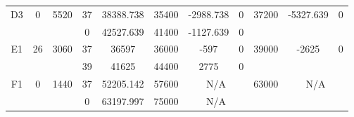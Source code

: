 \begin{sidewaystable}
\begin{tabular}{c||c|c||c|c|c|c|c||c|c|c}
         &
        
      \\
      \hline
      \multirow{2}{*}{D3} &
      \multirow{2}{*}{0} &
      \multirow{2}{*}{5520} &
      37 &
      38388.738 &
      35400 &
        -2988.738 &
        0 &
      \multirow{2}{*}{37200} &
        \multirow{2}{*}{-5327.639} &
        \multirow{2}{*}{0}
      \\
      \cline{4-8}
       &
       &
       &
      0 &
      42527.639 &
      41400 &
        -1127.639 &
        0 &
      
         &
        
      \\
      \hline
      \multirow{2}{*}{E1} &
      \multirow{2}{*}{26} &
      \multirow{2}{*}{3060} &
      37 &
      36597 &
      36000 &
        -597 &
        0 &
      \multirow{2}{*}{39000} &
        \multirow{2}{*}{-2625} &
        \multirow{2}{*}{0}
      \\
      \cline{4-8}
       &
       &
       &
      39 &
      41625 &
      44400 &
        2775 &
        0 &
      
         &
        
      \\
      \hline
      \multirow{2}{*}{F1} &
      \multirow{2}{*}{0} &
      \multirow{2}{*}{1440} &
      37 &
      52205.142 &
      57600 &
        \multicolumn{2}{|c||}{N/A} &
      \multirow{2}{*}{63000} &
        \multicolumn{2}{c}{\multirow{2}{*}{N/A}}
      \\
      \cline{4-8}
       &
       &
       &
      0 &
      63197.997 &
      75000 &
        \multicolumn{2}{|c||}{N/A} &
      
        
      \\
\end{tabular}
\label{table:RDS1.txt-1386.tex} 
\end{sidewaystable}